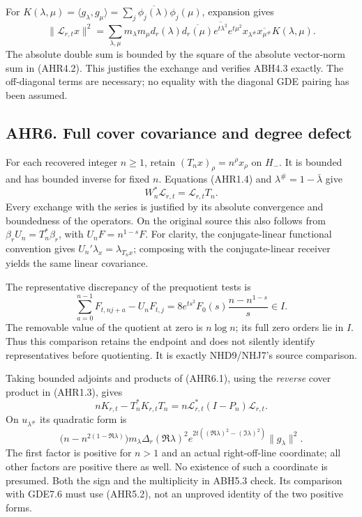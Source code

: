 For
\(K(\lambda,\mu)=\langle g_\lambda,g_\mu\rangle=\sum_j\overline{\phi_j(\lambda)}\phi_j(\mu)\),
expansion gives \[
\|\mathcal L_{r,t}x\|^2=
\sum_{\lambda,\mu}m_\lambda m_\mu
d_r(\lambda)\overline{d_r(\mu)}
\overline{e^{t\lambda^2}}e^{t\mu^2}
x_{\lambda^\#}\overline{x_{\mu^\#}}K(\lambda,\mu).
\tag{AHR5.3}
\] The absolute double sum is bounded by the square of the absolute
vector-norm sum in (AHR4.2). This justifies the exchange and verifies
ABH4.3 exactly. The off-diagonal terms are necessary; no equality with
the diagonal GDE pairing has been assumed.

\subsection{AHR6. Full cover covariance and degree
defect}\label{ahr6.-full-cover-covariance-and-degree-defect}

For each recovered integer \(n\ge1\), retain
\((T_nx)_\rho=n^\rho x_\rho\) on \(H_-\). It is bounded and has bounded
inverse for fixed \(n\). Equations (AHR1.4) and
\(\lambda^\#=1-\bar\lambda\) give \[
W_n^*\mathcal L_{r,t}=\mathcal L_{r,t}T_n.
\tag{AHR6.1}
\] Every exchange with the series is justified by its absolute
convergence and boundedness of the operators. On the original source
this also follows from \(\beta_rU_n=T_n^*\beta_r\), with
\(U_nF=n^{1-s}F\). For clarity, the conjugate-linear functional
convention gives \(U_n'\lambda_x=\lambda_{T_nx}\); composing with the
conjugate-linear receiver yields the same linear covariance.

The representative discrepancy of the prequotient tests is \[
\sum_{a=0}^{n-1}F_{t,nj+a}-U_nF_{t,j}
=8e^{ts^2}F_0(s)\frac{n-n^{1-s}}s\in I.
\tag{AHR6.2}
\] The removable value of the quotient at zero is \(n\log n\); its full
zero orders lie in \(I\). Thus this comparison retains the endpoint and
does not silently identify representatives before quotienting. It is
exactly NHD9/NHJ7's source comparison.

Taking bounded adjoints and products of (AHR6.1), using the
\emph{reverse} cover product in (AHR1.3), gives \[
nK_{r,t}-T_n^*K_{r,t}T_n
=n\mathcal L_{r,t}^*(I-P_n)\mathcal L_{r,t}.
\tag{AHR6.3}
\] On \(u_{\lambda^\#}\) its quadratic form is \[
\bigl(n-n^{2(1-\Re\lambda)}\bigr)
m_\lambda\Delta_r(\Re\lambda)^2
e^{2t((\Re\lambda)^2-(\Im\lambda)^2)}\|g_\lambda\|^2.
\tag{AHR6.4}
\] The first factor is positive for \(n>1\) and an actual right-off-line
coordinate; all other factors are positive there as well. No existence
of such a coordinate is presumed. Both the sign and the multiplicity in
ABH5.3 check. Its comparison with GDE7.6 must use (AHR5.2), not an
unproved identity of the two positive forms.

